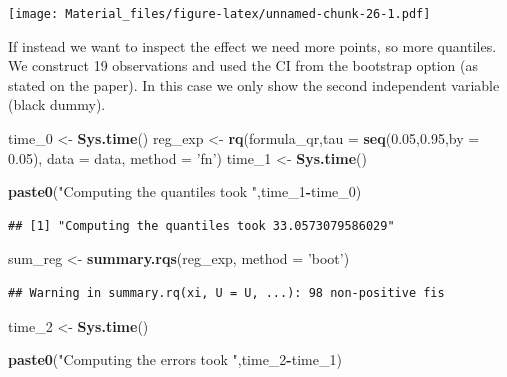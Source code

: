\documentclass[]{book}
\newenvironment{Shaded}{\begin{snugshade}}{\end{snugshade}}
\newcommand{\KeywordTok}[1]{\textcolor[rgb]{0.13,0.29,0.53}{\textbf{#1}}}
\newcommand{\DataTypeTok}[1]{\textcolor[rgb]{0.13,0.29,0.53}{#1}}
\newcommand{\DecValTok}[1]{\textcolor[rgb]{0.00,0.00,0.81}{#1}}
\newcommand{\FloatTok}[1]{\textcolor[rgb]{0.00,0.00,0.81}{#1}}
\newcommand{\StringTok}[1]{\textcolor[rgb]{0.31,0.60,0.02}{#1}}
\newcommand{\OperatorTok}[1]{\textcolor[rgb]{0.81,0.36,0.00}{\textbf{#1}}}
\newcommand{\NormalTok}[1]{#1}
\begin{document}
\texttt{[image: Material\_files/figure-latex/unnamed-chunk-26-1.pdf]}

If instead we want to inspect the effect we need more points, so more
quantiles. We construct 19 observations and used the CI from the
bootstrap option (as stated on the paper). In this case we only show the
second independent variable (black dummy).

\begin{Shaded}
\begin{Highlighting}[]
\NormalTok{time_}\DecValTok{0}\NormalTok{ <-}\StringTok{ }\KeywordTok{Sys.time}\NormalTok{()}
\NormalTok{reg_exp <-}\StringTok{ }\KeywordTok{rq}\NormalTok{(formula_qr,}\DataTypeTok{tau =} \KeywordTok{seq}\NormalTok{(}\FloatTok{0.05}\NormalTok{,}\FloatTok{0.95}\NormalTok{,}\DataTypeTok{by =} \FloatTok{0.05}\NormalTok{), }\DataTypeTok{data =}\NormalTok{ data, }\DataTypeTok{method =} \StringTok{'fn'}\NormalTok{)}
\NormalTok{time_}\DecValTok{1}\NormalTok{ <-}\StringTok{ }\KeywordTok{Sys.time}\NormalTok{()}

\KeywordTok{paste0}\NormalTok{(}\StringTok{"Computing the quantiles took "}\NormalTok{,time_}\DecValTok{1}\OperatorTok{-}\NormalTok{time_}\DecValTok{0}\NormalTok{)}
\end{Highlighting}
\end{Shaded}

\begin{verbatim}
## [1] "Computing the quantiles took 33.0573079586029"
\end{verbatim}

\begin{Shaded}
\begin{Highlighting}[]
\NormalTok{sum_reg <-}\StringTok{ }\KeywordTok{summary.rqs}\NormalTok{(reg_exp, }\DataTypeTok{method =} \StringTok{'boot'}\NormalTok{)}
\end{Highlighting}
\end{Shaded}

\begin{verbatim}
## Warning in summary.rq(xi, U = U, ...): 98 non-positive fis
\end{verbatim}

\begin{Shaded}
\begin{Highlighting}[]
\NormalTok{time_}\DecValTok{2}\NormalTok{ <-}\StringTok{ }\KeywordTok{Sys.time}\NormalTok{()}

\KeywordTok{paste0}\NormalTok{(}\StringTok{"Computing the errors took "}\NormalTok{,time_}\DecValTok{2}\OperatorTok{-}\NormalTok{time_}\DecValTok{1}\NormalTok{)}
\end{Highlighting}
\end{Shaded}
\end{document}
